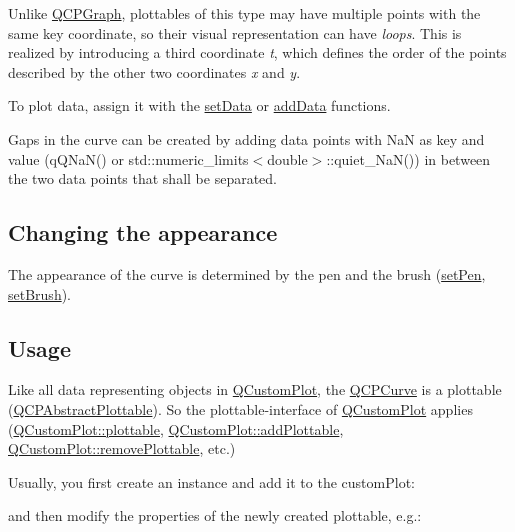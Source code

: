 Unlike \hyperlink{classQCPGraph}{Q\+C\+P\+Graph}, plottables of this type may have multiple points with the same key coordinate, so their visual representation can have {\itshape loops}. This is realized by introducing a third coordinate {\itshape t}, which defines the order of the points described by the other two coordinates {\itshape x} and {\itshape y}.

To plot data, assign it with the \hyperlink{classQCPCurve_a631ac886708460013b30052f49cbc9da}{set\+Data} or \hyperlink{classQCPCurve_a4e24023c3b9ac75440c7a260172c99af}{add\+Data} functions.

Gaps in the curve can be created by adding data points with Na\+N as key and value ({\ttfamily q\+Q\+Na\+N()} or {\ttfamily std\+::numeric\+\_\+limits$<$double$>$\+::quiet\+\_\+\+Na\+N()}) in between the two data points that shall be separated.\hypertarget{classQCPStatisticalBox_appearance}{}\subsection{Changing the appearance}\label{classQCPStatisticalBox_appearance}
The appearance of the curve is determined by the pen and the brush (\hyperlink{classQCPAbstractPlottable_ab74b09ae4c0e7e13142fe4b5bf46cac7}{set\+Pen}, \hyperlink{classQCPAbstractPlottable_a7a4b92144dca6453a1f0f210e27edc74}{set\+Brush}). \hypertarget{classQCPStatisticalBox_usage}{}\subsection{Usage}\label{classQCPStatisticalBox_usage}
Like all data representing objects in \hyperlink{classQCustomPlot}{Q\+Custom\+Plot}, the \hyperlink{classQCPCurve}{Q\+C\+P\+Curve} is a plottable (\hyperlink{classQCPAbstractPlottable}{Q\+C\+P\+Abstract\+Plottable}). So the plottable-\/interface of \hyperlink{classQCustomPlot}{Q\+Custom\+Plot} applies (\hyperlink{classQCustomPlot_a32de81ff53e263e785b83b52ecd99d6f}{Q\+Custom\+Plot\+::plottable}, \hyperlink{classQCustomPlot_ab7ad9174f701f9c6f64e378df77927a6}{Q\+Custom\+Plot\+::add\+Plottable}, \hyperlink{classQCustomPlot_af3dafd56884208474f311d6226513ab2}{Q\+Custom\+Plot\+::remove\+Plottable}, etc.)

Usually, you first create an instance and add it to the custom\+Plot\+: 
\begin{DoxyCodeInclude}
\end{DoxyCodeInclude}
and then modify the properties of the newly created plottable, e.\+g.\+: 
\begin{DoxyCodeInclude}
\end{DoxyCodeInclude}



